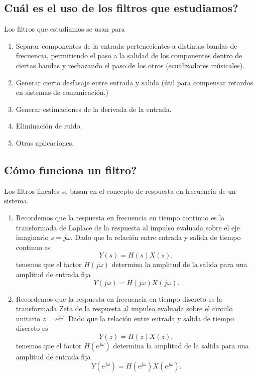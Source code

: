 \subsection{\textquestiondown Cu\'{a}l es el uso de los filtros que estudiamos?}

Los filtros que estudiamos se usan para 

\begin{enumerate}
\item   Separar componentes de la entrada pertenecientes a distintas bandas de frecuencia, 
permitiendo el paso a la salidad de los componentes dentro de ciertas bandas y rechazando 
el paso de los otros (ecualizadores m\'{u}sicales).
                
\item   Generar cierto desfasaje entre entrada y salida (\'{u}til para compensar retardos 
en sistemas de comunicaci\'{o}n.)
        
\item   Generar estimaciones de la derivada de la entrada.
        
\item   Eliminaci\'{o}n de ruido.
        
\item   Otras aplicaciones.
\end{enumerate}

\subsection{\textquestiondown C\'{o}mo funciona un filtro?}

Los filtros lineales se basan en el concepto de respuesta en frecuencia de un sistema.  
\begin{enumerate}
\item   Recordemos que la respuesta en frecuencia en tiempo continuo es la transformada de Laplace 
de la respuesta al impulso evaluada sobre el eje imaginario $s = j \omega$. 
Dado que la relaci\'{o}n entre entrada y salida de tiempo continuo es
\begin{equation}
  Y(s) = H(s) X(s),
\end{equation}
tenemos que el factor $H( j \omega)$ determina la amplitud de la salida para una amplitud de entrada fija
\begin{equation}
  Y(j \omega) = H(j \omega) X(j \omega).
\end{equation}

        
\item   Recordemos que la respuesta en frecuencia en tiempo discreto es la transformada Zeta de la 
respuesta al impulso evaluada sobre el c\'{\i}rculo unitario $z = e^{j \omega}$. 
Dado que la relaci\'{o}n entre entrada y salida de tiempo discreto es
\begin{equation}
  Y(z) = H(z) X(z),
\end{equation}
tenemos que el factor $H(e^{j \omega})$ determina la amplitud de la salida para una amplitud de entrada 
fija
\begin{equation}
  Y(e^{j \omega}) = H(e^{j \omega}) X(e^{j \omega}).
\end{equation}

\end{enumerate}

